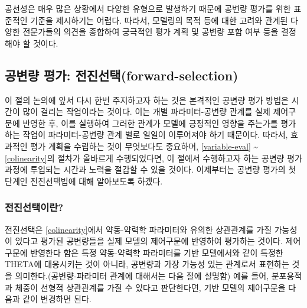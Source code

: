 \documentclass[
  11pt,
  krantz2, a4paper, twoside]{krantz}
\theoremstyle{definition}
\theoremstyle{definition}
\theoremstyle{definition}
\theoremstyle{remark}
\begin{document}
공선성은 매우 많은 상황에서 다양한 유형으로 발생하기 때문에 공변량 평가를 위한 표준적인 기준을 제시하기는 어렵다. 따라서, 모델링의 목적 등에 대한 고려와 관계된 다양한 전문가들의 의견을 종합하여 궁극적인 평가 계획 및 공변량 포함 여부 등을 결정해야 할 것이다.

\hypertarget{uxacf5uxbcc0uxb7c9-uxd3c9uxac00-uxc804uxc9c4uxc120uxd0ddforward-selection}{%
\subsection{공변량 평가: 전진선택(forward-selection)}\label{uxacf5uxbcc0uxb7c9-uxd3c9uxac00-uxc804uxc9c4uxc120uxd0ddforward-selection}}


이 절의 논의에 앞서 다시 한번 주지하고자 하는 것은 본격적인 공변량 평가 방법은 시간이 많이 걸리는 작업이라는 것이다. 이는 개별 파라미터-공변량 관계를 실제 제어구문에 반영한 후, 이를 실행하여 그러한 관계가 모델에 긍정적인 영향을 주는가를 평가하는 작업이 파라미터-공변량 관계 별로 일일이 이루어져야 하기 때문이다. 따라서, 효과적인 평가 계획을 수립하는 것이 무엇보다도 중요하며, \ref{variable-eval} \textasciitilde{} \ref{colinearity}의 절차가 올바르게 수행되었다면, 이 절에서 수행하고자 하는 공변량 평가 과정에 투입되는 시간과 노력을 절감할 수 있을 것이다. 이제부터는 공변량 평가의 첫 단계인 전진선택법에 대해 알아보도록 하겠다.

\hypertarget{forward-sel-def}{%
\subsubsection{전진선택이란?}\label{forward-sel-def}}


전진선택은 \ref{colinearity}에서 약동-약력학 파라미터와 유의한 상관관계를 가질 가능성이 있다고 평가된 공변량들을 실제 모델의 제어구문에 반영하여 평가하는 것이다. 제어구문에 반영한다 함은 특정 약동-약력학 파라미터를 기반 모델에서와 같이 특정한 THETA에 대응시키는 것이 아니라, 공변량과 가장 가능성 있는 관계로서 표현하는 것을 의미한다.(공변량-파라미터 관계에 대해서는 다음 절에 설명함) 예를 들어, 분포용적과 체중이 선형적 상관관계를 가질 수 있다고 판단한다면, 기반 모델의 제어구문을 다음과 같이 변경하면 된다.
\end{document}
